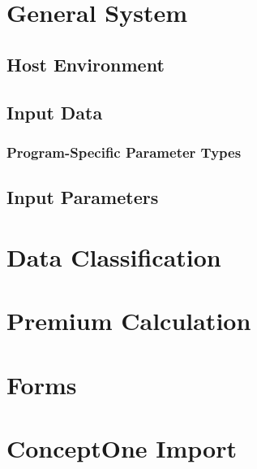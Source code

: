 


\pnumoff\part{General System}\pnumon

\chapter{Host Environment}
  

\chapter{Input Data}
    

    \section{Program-Specific Parameter Types}


\chapter{Input Parameters}
    



\pnumoff\part{Data Classification}\pnumon
  

\pnumoff\part{Premium Calculation}\pnumon
  

\pnumoff\part{Forms}\pnumon


\pnumoff\part{ConceptOne Import}\pnumon


